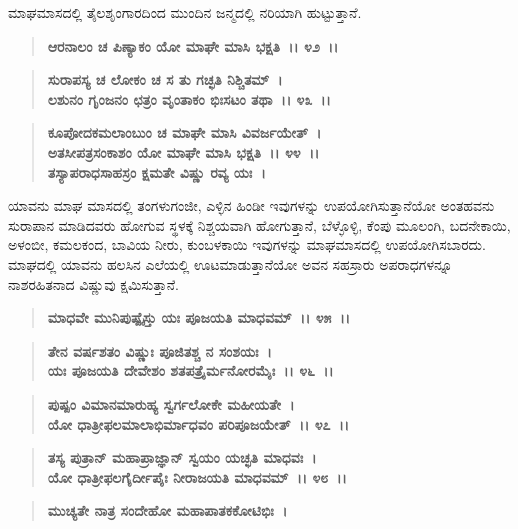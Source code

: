 ಮಾಘಮಾಸದಲ್ಲಿ ತೈಲಶೃಂಗಾರದಿಂದ ಮುಂದಿನ ಜನ್ಮದಲ್ಲಿ ನರಿಯಾಗಿ ಹುಟ್ಟುತ್ತಾನೆ.

\begin{verse}
\textbf{ಆರನಾಲಂ ಚ ಪಿಣ್ಯಾಕಂ ಯೋ ಮಾಘೇ ಮಾಸಿ ಭಕ್ಷತಿ~।। ೪೨~।।}
\end{verse}

\begin{verse}
\textbf{ಸುರಾಪಸ್ಯ ಚ ಲೋಕಂ ಚ ಸ ತು ಗಚ್ಛತಿ ನಿಶ್ಚಿತಮ್~।}\\\textbf{ಲಶುನಂ ಗೃಂಜನಂ ಛತ್ರಂ ವೃಂತಾಕಂ ಭಿಃಸಟಂ ತಥಾ~।। ೪೩~।। }
\end{verse}

\begin{verse}
\textbf{ಕೂಪೋದಕಮಲಾಂಬುಂ ಚ ಮಾಘೇ ಮಾಸಿ ವಿವರ್ಜಯೇತ್~।}\\\textbf{ಅತಸೀಪತ್ರಸಂಕಾಶಂ ಯೋ ಮಾಘೇ ಮಾಸಿ ಭಕ್ಷತಿ~।। ೪೪~।। }\\\textbf{ತಸ್ಯಾಪರಾಧಸಾಹಸ್ರಂ ಕ್ಷಮತೇ ವಿಷ್ಣು ರವ್ಯ ಯಃ~।}
\end{verse}

ಯಾವನು ಮಾಘ ಮಾಸದಲ್ಲಿ ತಂಗಳುಗಂಜೀ, ಎಳ್ಳಿನ ಹಿಂಡೀ ಇವುಗಳನ್ನು ಉಪಯೋಗಿಸುತ್ತಾನೆಯೋ ಅಂತಹವನು ಸುರಾಪಾನ ಮಾಡಿದವರು ಹೋಗುವ ಸ್ಥಳಕ್ಕೆ ನಿಶ್ಚಯವಾಗಿ ಹೋಗುತ್ತಾನೆ, ಬೆಳ್ಳೊಳ್ಳಿ, ಕೆಂಪು ಮೂಲಂಗಿ, ಬದನೇಕಾಯಿ, ಅಳಂಬೀ, ಕಮಲಕಂದ, ಬಾವಿಯ ನೀರು, ಕುಂಬಳಕಾಯಿ ಇವುಗಳನ್ನು ಮಾಘಮಾಸದಲ್ಲಿ ಉಪಯೋಗಿಸಬಾರದು. ಮಾಘದಲ್ಲಿ ಯಾವನು ಹಲಸಿನ ಎಲೆಯಲ್ಲಿ ಊಟಮಾಡುತ್ತಾನೆಯೋ ಅವನ ಸಹಸ್ರಾರು ಅಪರಾಧಗಳನ್ನೂ ನಾಶರಹಿತನಾದ ವಿಷ್ಣುವು ಕ್ಷಮಿಸುತ್ತಾನೆ.

\begin{verse}
\textbf{ಮಾಧವೇ ಮುನಿಪುಷ್ಪೈಸ್ತು ಯಃ ಪೂಜಯತಿ ಮಾಧವಮ್~।। ೪೫~।। }
\end{verse}

\begin{verse}
\textbf{ತೇನ ವರ್ಷಶತಂ ವಿಷ್ಣುಃ ಪೂಜಿತಶ್ಚ ನ ಸಂಶಯಃ~।}\\\textbf{ಯಃ ಪೂಜಯತಿ ದೇವೇಶಂ ಶತಪತ್ರೈರ್ಮನೋರಮೈಃ~।। ೪೬~।। }
\end{verse}

\begin{verse}
\textbf{ಪುಷ್ಪಂ ವಿಮಾನಮಾರುಹ್ಯ ಸ್ವರ್ಗಲೋಕೇ ಮಹೀಯತೇ~।}\\\textbf{ಯೋ ಧಾತ್ರೀಫಲಮಾಲಾಭಿರ್ಮಾಧವಂ ಪರಿಪೂಜಯೇತ್~।। ೪೭~।। }
\end{verse}

\begin{verse}
\textbf{ತಸ್ಯ ಪುತ್ರಾನ್ ಮಹಾಪ್ರಾಜ್ಞಾನ್ ಸ್ವಯಂ ಯಚ್ಛತಿ ಮಾಧವಃ~।}\\\textbf{ಯೋ ಧಾತ್ರೀಫಲಗೈರ್ದೀಪೈಃ ನೀರಾಜಯತಿ ಮಾಧವಮ್~।। ೪೮~।। }
\end{verse}

\begin{verse}
\textbf{ಮುಚ್ಯತೇ ನಾತ್ರ ಸಂದೇಹೋ ಮಹಾಪಾತಕಕೋಟಿಭಿಃ~।}
\end{verse}


